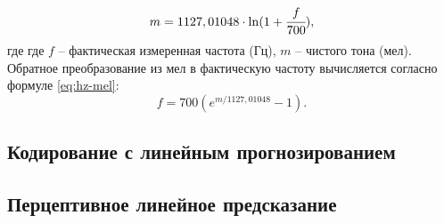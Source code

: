 \begin{equation}\label{eq:mel-hz}
	m = 1127,01048 \cdot \ln(1 + \cfrac{f}{700}),
\end{equation}
где где $f$ -- фактическая измеренная частота (Гц), $m$ -- чистого тона (мел).
\noindent Обратное преобразование из мел в фактическую частоту вычисляется согласно формуле \ref{eq:hz-mel}:
\begin{equation}\label{eq:hz-mel}
	f = 700(e^{m/1127,01048} - 1). 
\end{equation}
\subsection{Кодирование с линейным прогнозированием}
\subsection{Перцептивное линейное предсказание}


